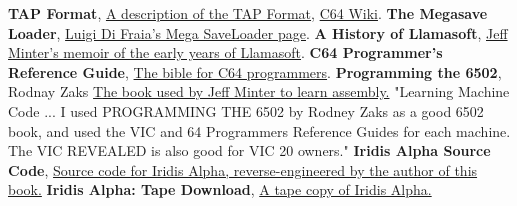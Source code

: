 \renewcommand{\bibname}{Notes \&\ References}
\begin{thebibliography}{999}


  \textbf{TAP Format},
  \href{http://unusedino.de/ec64/technical/formats/tap.html}{A description of the TAP Format},
  \href{https://www.c64-wiki.com/wiki/TAP}{C64 Wiki}.
  \textbf{The Megasave Loader},
  \href{https://www.luigidifraia.com/doku/doku.php?id=commodore:tapes:loaders:mega-save}{Luigi Di Fraia's Mega SaveLoader page}.
  \textbf{A History of Llamasoft},
  \href{http://minotaurproject.co.uk/YakImages/AHistoryofLlamasoft.pdf}{Jeff Minter's memoir of the early years of Llamasoft}.
  \textbf{C64 Programmer's Reference Guide},
  \href{https://archive.org/details/c64-programmer-ref}{The bible for C64 programmers}.
  \textbf{Programming the 6502}, Rodnay Zaks
  \href{https://archive.org/details/Programming_the_6502_OCR}{The book used by Jeff Minter to learn assembly.} "Learning Machine Code ... I used PROGRAMMING THE 6502 by Rodney Zaks as a good 6502 book, and used the VIC and 64 Programmers Reference Guides for each machine. The VIC REVEALED is also good for VIC 20 owners."
  \textbf{Iridis Alpha Source Code},
  \href{https://github.com/mwenge/iridisalpha}{Source code for Iridis Alpha, reverse-engineered by the author of this book.}
  \textbf{Iridis Alpha: Tape Download},
  \href{http://www.llamasoftarchive.org/oldsite/llamasoft/cbm64/IridisAlpha.zip}{A tape copy of Iridis Alpha.}


\end{thebibliography}
